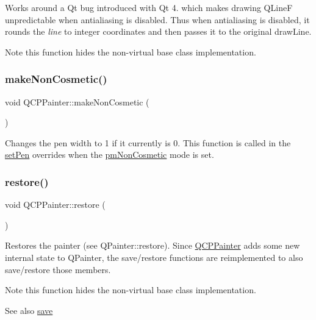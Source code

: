 Works around a Qt bug introduced with Qt 4. which makes drawing Q\+LineF unpredictable when antialiasing is disabled. Thus when antialiasing is disabled, it rounds the {\itshape line} to integer coordinates and then passes it to the original draw\+Line.

\begin{DoxyNote}{Note}
this function hides the non-\/virtual base class implementation. 
\end{DoxyNote}
\mbox{\label{classQCPPainter_a7e63fbcf47e35c6f2ecd11b8fef7c7d8}} 
\subsubsection{\texorpdfstring{make\+Non\+Cosmetic()}{makeNonCosmetic()}}
{\footnotesize\ttfamily void Q\+C\+P\+Painter\+::make\+Non\+Cosmetic (\begin{DoxyParamCaption}{ }\end{DoxyParamCaption})}

Changes the pen width to 1 if it currently is 0. This function is called in the \hyperlink{classQCPPainter_af9c7a4cd1791403901f8c5b82a150195}{set\+Pen} overrides when the \hyperlink{classQCPPainter_a156cf16444ff5e0d81a73c615fdb156dac1e481bfaf408f2bd2eaad3ec341f36b}{pm\+Non\+Cosmetic} mode is set. \mbox{\label{classQCPPainter_a64908e6298d5bbd83457dc987cc3a022}} 
\subsubsection{\texorpdfstring{restore()}{restore()}}
{\footnotesize\ttfamily void Q\+C\+P\+Painter\+::restore (\begin{DoxyParamCaption}{ }\end{DoxyParamCaption})}

Restores the painter (see Q\+Painter\+::restore). Since \hyperlink{classQCPPainter}{Q\+C\+P\+Painter} adds some new internal state to Q\+Painter, the save/restore functions are reimplemented to also save/restore those members.

\begin{DoxyNote}{Note}
this function hides the non-\/virtual base class implementation.
\end{DoxyNote}
\begin{DoxySeeAlso}{See also}
\hyperlink{classQCPPainter_a8fd6821ee6fecbfa04444c9062912abd}{save} 
\end{DoxySeeAlso}
\mbox{\label{classQCPPainter_a8fd6821ee6fecbfa04444c9062912abd}} 
